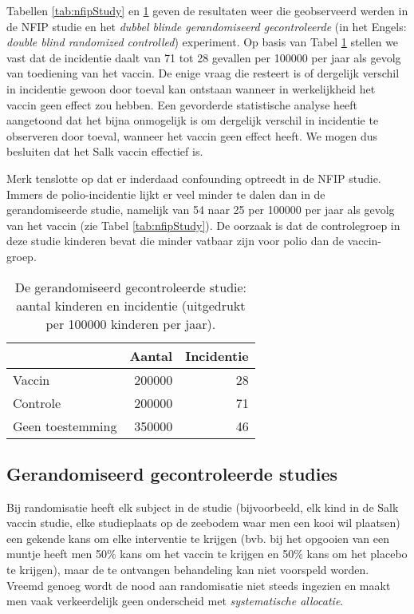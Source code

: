 \documentclass[12pt,dutch,coursenotes]{book}
\theoremstyle{definition}
\theoremstyle{definition}
\theoremstyle{definition}
\theoremstyle{remark}
\begin{document}
Tabellen \ref{tab:nfipStudy} en \ref{tab:dbrcStudy} geven de resultaten
weer die geobserveerd werden in de NFIP studie en het \emph{dubbel
blinde gerandomiseerd gecontroleerde} (in het Engels: \emph{double blind
randomized controlled}) experiment. Op basis van Tabel
\ref{tab:dbrcStudy} stellen we vast dat de incidentie daalt van 71 tot
28 gevallen per 100000 per jaar als gevolg van toediening van het
vaccin. De enige vraag die resteert is of dergelijk verschil in
incidentie gewoon door toeval kan ontstaan wanneer in werkelijkheid het
vaccin geen effect zou hebben. Een gevorderde statistische analyse heeft
aangetoond dat het bijna onmogelijk is om dergelijk verschil in
incidentie te observeren door toeval, wanneer het vaccin geen effect
heeft. We mogen dus besluiten dat het Salk vaccin effectief is.

Merk tenslotte op dat er inderdaad confounding optreedt in de NFIP
studie. Immers de polio-incidentie lijkt er veel minder te dalen dan in
de gerandomiseerde studie, namelijk van 54 naar 25 per 100000 per jaar
als gevolg van het vaccin (zie Tabel \ref{tab:nfipStudy}). De oorzaak is
dat de controlegroep in deze studie kinderen bevat die minder vatbaar
zijn voor polio dan de vaccin-groep.

\begin{table}[t]

\caption{\label{tab:dbrcStudy}De gerandomiseerd gecontroleerde studie: aantal kinderen en incidentie (uitgedrukt per
100000 kinderen per jaar).}
\centering
\begin{tabular}{lrr}
\toprule
  & Aantal & Incidentie\\
\midrule
Vaccin & 200000 & 28\\
Controle & 200000 & 71\\
Geen toestemming & 350000 & 46\\
\bottomrule
\end{tabular}
\end{table}

\subsection{Gerandomiseerd gecontroleerde
studies}\label{gerandomiseerd-gecontroleerde-studies}

Bij randomisatie heeft elk subject in de studie (bijvoorbeeld, elk kind
in de Salk vaccin studie, elke studieplaats op de zeebodem waar men een
kooi wil plaatsen) een gekende kans om elke interventie te krijgen (bvb.
bij het opgooien van een muntje heeft men 50\% kans om het vaccin te
krijgen en 50\% kans om het placebo te krijgen), maar de te ontvangen
behandeling kan niet voorspeld worden. Vreemd genoeg wordt de nood aan
randomisatie niet steeds ingezien en maakt men vaak verkeerdelijk geen
onderscheid met \emph{systematische allocatie}.
\end{document}
